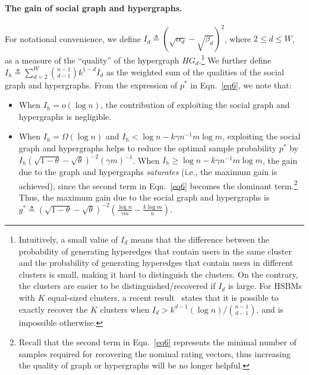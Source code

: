 \documentclass{article}
\begin{document}
\paragraph{The gain of social graph and hypergraphs.} For notational convenience, we define $I_d \triangleq (\sqrt{\alpha_d}-\sqrt{\beta_d})^2$, where $2 \le d \le W$, as a measure of the ``quality'' of the hypergraph $HG_d$.\footnote{Intuitively, a small value of $I_d$ means that the difference between the probability of generating hyperedges that contain users in the same cluster and the probability of generating hyperedges that contain users in different clusters is small, making it hard to distinguish the clusters. On the contrary, the clusters are easier to be distinguished/recovered if $I_d$ is large. For HSBMs with $K$ equal-sized clusters, a recent result~\citep{zhang2022exact} states that it is possible to exactly recover the $K$ clusters when $I_d > k^{d-1} (\log n)/\binom{n-1}{d-1}$, and is impossible otherwise.} We further define  $I_h \triangleq \sum_{d=2}^{W} \binom{n-1}{d-1} k^{1-d} I_d$ as the weighted sum of the qualities of the social graph and hypergraphs. From the expression of $p^*$ in Eqn.~\eqref{eq6}, we note that:

\begin{itemize}[wide, labelwidth=!, labelindent=0pt]
    \item When $I_h = o(\log n)$, the contribution of exploiting the social graph and hypergraphs is negligible.
    \item When $I_h = \Omega(\log n)$ and $I_h < \log n -k \gamma n^{-1} m \log m$, exploiting the social graph and hypergraphs helps to reduce the optimal sample probability $p^*$ by $I_h(\sqrt{1-\theta} - \sqrt{\theta})^{-2}(\gamma m)^{-1}$. When $I_h \ge \log n -k \gamma n^{-1} m \log m$, the gain due to the graph and hypergraphs \emph{saturates} (i.e., the maximum gain is achieved), since the second term in Eqn.~\eqref{eq6} becomes the dominant term.\footnote{Recall that the second term in Eqn.~\eqref{eq6} represents the minimal number of samples required for recovering the nominal rating vectors, thus increasing the quality of graph or hypergraphs will be no longer helpful.} Thus, the maximum gain due to the social graph and hypergraphs is $g^* \triangleq (\sqrt{1-\theta} - \sqrt{\theta})^{-2} (\frac{\log n}{\gamma m} - \frac{k \log m}{n})$.
\end{itemize}
\end{document}
